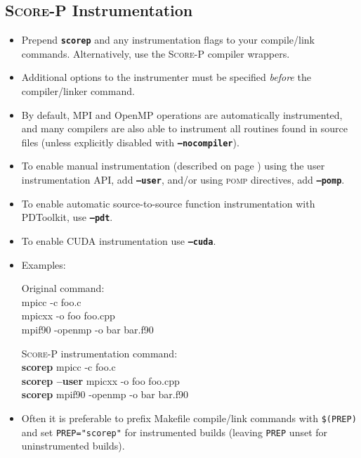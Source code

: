 \documentclass[a4paper]{article}
\newcommand{\Scorep}{\textsc{Score-P}\xspace}
\begin{document}
\subsection*{\Scorep Instrumentation}
\begin{itemize}
  \item Prepend \textbf{\texttt{scorep}} and any instrumentation flags to your 
        compile/link commands.  Alternatively, use the \Scorep compiler wrappers.
  \item Additional options to the instrumenter must be specified
        \textit{before} the compiler/linker command.
  \item By default, MPI and OpenMP operations are automatically instrumented, and
        many compilers are also able to instrument all routines found in source files
        (unless explicitly disabled with \textbf{\texttt{--nocompiler}}).
  \item To enable manual instrumentation (described on page \pageref{sec:manual_inst})
        using the user instrumentation API, add \textbf{\texttt{--user}},
        and/or using \textsc{pomp} directives, add \textbf{\texttt{--pomp}}.
  \item To enable automatic source-to-source function instrumentation with PDToolkit, use \textbf{\texttt{--pdt}}.
  \item To enable CUDA instrumentation use \textbf{\texttt{--cuda}}.
  \item Examples: \\
    \begin{minipage}[t]{0.4\linewidth}
      Original command: \\\ttfamily
      mpicc -c foo.c \\
      mpicxx -o foo foo.cpp \\
      mpif90 -openmp -o bar bar.f90
    \end{minipage}
    \begin{minipage}[t]{0.59\linewidth}
      \Scorep instrumentation command: \\\ttfamily
      \textbf{scorep} mpicc -c foo.c \\
      \textbf{scorep --user} mpicxx -o foo foo.cpp \\
      \textbf{scorep} mpif90 -openmp -o bar bar.f90
    \end{minipage}
  \item Often it is preferable to prefix Makefile compile/link commands
        with \texttt{\$(PREP)} and set \texttt{PREP="scorep"} for
        instrumented builds (leaving \texttt{PREP} unset for uninstrumented builds).
\end{itemize}
\end{document}

